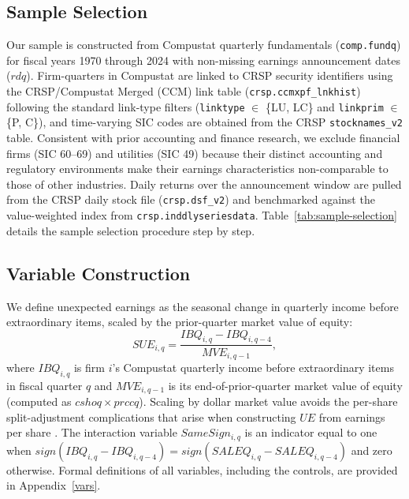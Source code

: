 \documentclass[english,12pt]{article}
\begin{document}
\subsection{Sample Selection}\label{sec:sample}

Our sample is constructed from Compustat quarterly fundamentals (\texttt{comp.fundq}) for fiscal years 1970 through 2024 with non-missing earnings announcement dates ($rdq$). Firm-quarters in Compustat are linked to CRSP security identifiers using the CRSP/Compustat Merged (CCM) link table (\texttt{crsp.ccmxpf\_lnkhist}) following the standard link-type filters (\texttt{linktype} $\in$ \{LU, LC\} and \texttt{linkprim} $\in$ \{P, C\}), and time-varying SIC codes are obtained from the CRSP \texttt{stocknames\_v2} table. Consistent with prior accounting and finance research, we exclude financial firms (SIC 60--69) and utilities (SIC 49) because their distinct accounting and regulatory environments make their earnings characteristics non-comparable to those of other industries. Daily returns over the announcement window are pulled from the CRSP daily stock file (\texttt{crsp.dsf\_v2}) and benchmarked against the value-weighted index from \texttt{crsp.inddlyseriesdata}. Table~\ref{tab:sample-selection} details the sample selection procedure step by step.

\subsection{Variable Construction}\label{sec:variables}

We define unexpected earnings as the seasonal change in quarterly income before extraordinary items, scaled by the prior-quarter market value of equity:
\begin{equation}\label{eq:ue}
SUE_{i,q} = \frac{IBQ_{i,q} - IBQ_{i,q-4}}{MVE_{i,q-1}},
\end{equation}
where $IBQ_{i,q}$ is firm $i$'s Compustat quarterly income before extraordinary items in fiscal quarter $q$ and $MVE_{i,q-1}$ is its end-of-prior-quarter market value of equity (computed as $cshoq \times prccq$). Scaling by dollar market value avoids the per-share split-adjustment complications that arise when constructing $UE$ from earnings per share \citep[see][for the per-share formulation]{bernard1989post}. The interaction variable $SameSign_{i,q}$ is an indicator equal to one when $\textit{sign}(IBQ_{i,q} - IBQ_{i,q-4}) = \textit{sign}(SALEQ_{i,q} - SALEQ_{i,q-4})$ and zero otherwise. Formal definitions of all variables, including the controls, are provided in Appendix~\ref{vars}.
\end{document}
